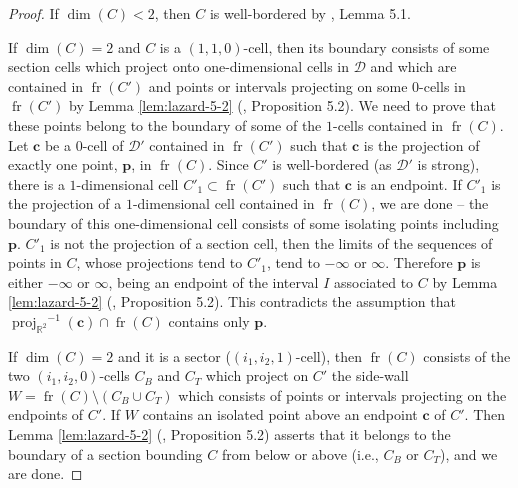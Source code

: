 \documentclass[
]{book}
\theoremstyle{definition}
\theoremstyle{definition}
\theoremstyle{definition}
\theoremstyle{definition}
\theoremstyle{remark}
\begin{document}
\begin{proof}
If \(\dim(C) < 2\), then \(C\) is well-bordered by \citet{lazard10}, Lemma 5.1.

If \(\dim(C) = 2\) and \(C\) is a \((1,1,0)\)-cell, then its boundary consists of some section cells which project onto one-dimensional cells in \(\mathcal{D}\) and which are contained in \({\operatorname{fr} \left( C' \right)}\) and points or intervals projecting on some \(0\)-cells in \({\operatorname{fr} \left( C' \right)}\) by Lemma \ref{lem:lazard-5-2} (\citet{lazard10}, Proposition 5.2).
We need to prove that these points belong to the boundary of some of the \(1\)-cells contained in \({\operatorname{fr} \left( C \right)}\).
Let \(\mathbf{c}\) be a \(0\)-cell of \(\mathcal{D'}\) contained in \({\operatorname{fr} \left( C' \right)}\) such that \(\mathbf{c}\) is the projection of exactly one point, \(\mathbf{p}\), in \({\operatorname{fr} \left( C \right)}\).
Since \(C'\) is well-bordered (as \(\mathcal{D'}\) is strong), there is a \(1\)-dimensional cell \(C'_1 \subset {\operatorname{fr} \left( C' \right)}\) such that \(\mathbf{c}\) is an endpoint.
If \(C'_1\) is the projection of a \(1\)-dimensional cell contained in \({\operatorname{fr} \left( C \right)}\), we are done -- the boundary of this one-dimensional cell consists of some isolating points including \(\mathbf{p}\).
\(C'_1\) is not the projection of a section cell, then the limits of the sequences of points in \(C\), whose projections tend to \(C'_1\), tend to \(-\infty\) or \(\infty\). Therefore \(\mathbf{p}\) is either \(-\infty\) or \(\infty\), being an endpoint of the interval \(I\) associated to \(C\) by Lemma \ref{lem:lazard-5-2} (\citet{lazard10}, Proposition 5.2). This contradicts the assumption that \({\operatorname{proj}_{\mathbb{R}^{2}}}^{-1}(\mathbf{c}) \cap {\operatorname{fr} \left( C \right)}\) contains only \(\mathbf{p}\).

If \(\dim(C) = 2\) and it is a sector (\((i_1,i_2,1)\)-cell), then \({\operatorname{fr} \left( C \right)}\) consists of the two \((i_1,i_2,0)\)-cells \(C_B\) and \(C_T\) which project on \(C'\) the side-wall \(W = {\operatorname{fr} \left( C \right)} \setminus (C_B \cup C_T)\) which consists of points or intervals projecting on the endpoints of \(C'\).
If \(W\) contains an isolated point above an endpoint \(\mathbf{c}\) of \(C'\). Then Lemma \ref{lem:lazard-5-2} (\citet{lazard10}, Proposition 5.2) asserts that it belongs to the boundary of a section bounding \(C\) from below or above (i.e., \(C_B\) or \(C_T\)), and we are done.


\end{proof}
\end{document}
